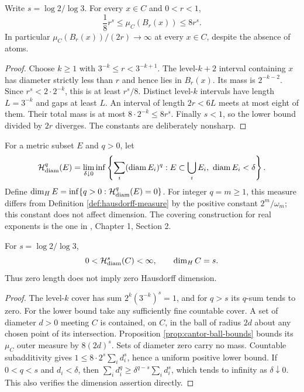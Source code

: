 \begin{proposition}\label{prop:cantor-ball-bounds}
Write $s=\log2/\log3$. For every $x\in C$ and $0<r<1$,
\[
 \frac18r^s\leq\mu_C(B_r(x))\leq8r^s.
\]
In particular $\mu_C(B_r(x))/(2r)\to\infty$ at every $x\in C$, despite the absence of atoms.
\end{proposition}
\begin{proof}
Choose $k\geq1$ with $3^{-k}\leq r<3^{-k+1}$. The level-$k+2$ interval containing $x$ has diameter strictly less than $r$ and hence lies in $B_r(x)$. Its mass is $2^{-k-2}$. Since $r^s<2\cdot2^{-k}$, this is at least $r^s/8$. Distinct level-$k$ intervals have length $L=3^{-k}$ and gaps at least $L$. An interval of length $2r<6L$ meets at most eight of them. Their total mass is at most $8\cdot2^{-k}\leq8r^s$. Finally $s<1$, so the lower bound divided by $2r$ diverges. The constants are deliberately nonsharp.
\end{proof}

\begin{definition}\label{def:hausdorff-dimension-examples}
For a metric subset $E$ and $q>0$, let
\[
 \mathcal H^q_{\rm diam}(E)=\lim_{\delta\downarrow0}
 \inf\left\{\sum_i(\operatorname{diam}E_i)^q:
 E\subset\bigcup_iE_i,\ \operatorname{diam}E_i<\delta\right\}.
\]
Define $\dim_H E=\inf\{q>0:\mathcal H^q_{\rm diam}(E)=0\}$. For integer $q=m\geq1$, this measure differs from Definition \ref{def:hausdorff-measure} by the positive constant $2^m/\omega_m$; this constant does not affect dimension. The covering construction for real exponents is the one in \cite{Sim18}, Chapter 1, Section 2.
\end{definition}

\begin{proposition}\label{prop:cantor-dimension}
For $s=\log2/\log3$,
\[
 0<\mathcal H^s_{\rm diam}(C)<\infty,\qquad \dim_H C=s.
\]
Thus zero length does not imply zero Hausdorff dimension.
\end{proposition}
\begin{proof}
The level-$k$ cover has sum $2^k(3^{-k})^s=1$, and for $q>s$ its $q$-sum tends to zero. For the lower bound take any sufficiently fine countable cover. A set of diameter $d>0$ meeting $C$ is contained, on $C$, in the ball of radius $2d$ about any chosen point of its intersection. Proposition \ref{prop:cantor-ball-bounds} bounds its $\mu_C$ outer measure by $8(2d)^s$. Sets of diameter zero carry no mass. Countable subadditivity gives $1\leq8\cdot2^s\sum_i d_i^s$, hence a uniform positive lower bound. If $0<q<s$ and $d_i<\delta$, then $\sum_i d_i^q\geq\delta^{q-s}\sum_i d_i^s$, which tends to infinity as $\delta\downarrow0$. This also verifies the dimension assertion directly.
\end{proof}

